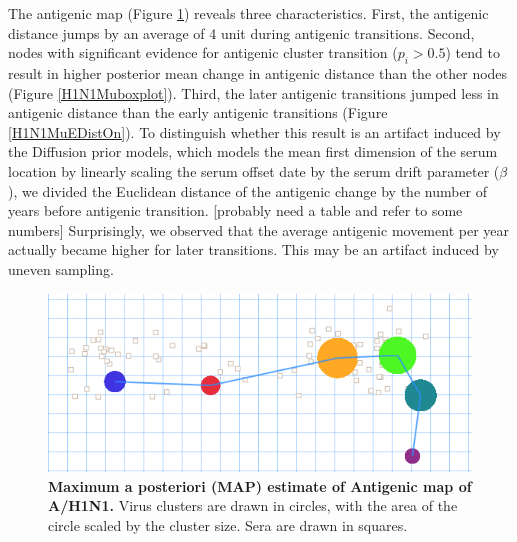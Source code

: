 \documentclass[11pt,oneside,letterpaper]{article}
\begin{document}
The antigenic map (Figure \ref{H1N1antigenicMap}) reveals three characteristics.
First, the antigenic distance jumps by an average of 4 unit during antigenic transitions. 
Second, nodes with significant evidence for antigenic cluster transition ($p_i > 0.5$) tend to result in higher posterior mean change in antigenic distance than the other nodes (Figure \ref{H1N1Muboxplot}).
Third, the later antigenic transitions jumped less in antigenic distance than the early antigenic transitions (Figure \ref{H1N1MuEDistOn}). 
To distinguish whether this result is an artifact induced by the Diffusion prior models, which models the mean first dimension of the serum location by linearly scaling the serum offset date by the serum drift parameter ($\beta$), we divided the Euclidean distance of the antigenic change by the number of years before antigenic transition. [probably need a table and refer to some numbers]
Surprisingly, we observed that the average antigenic movement per year actually became higher for later transitions. 
This may be an artifact induced by uneven sampling.







\begin{figure}[h]
	\centering		
	\includegraphics[width=1\textwidth]{figures/custom/H1N1Euclid}
	\caption{\textbf{Maximum a posteriori (MAP) estimate of Antigenic map of A/H1N1.} %
 Virus clusters are drawn in circles, with the area of the circle scaled by the cluster size. Sera are drawn in squares.
	 		} 
	\label{H1N1antigenicMap} 
\end{figure}
\end{document}

